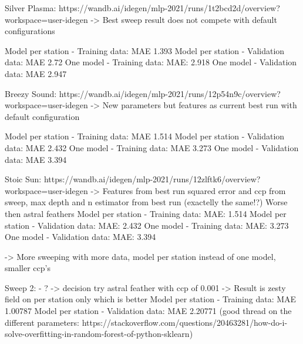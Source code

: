 \documentclass{article}
\begin{document}
{{{{{{{{                                Silver Plasma: https://wandb.ai/idegen/mlp-2021/runs/1t2bcd2d/overview?workspace=user-idegen
                                -> Best sweep result does not compete with default configurations

                                Model per station - Training data: MAE 1.393
                                Model per station - Validation data: MAE 2.72
                                One model - Training data: MAE: 2.918
                                One model - Validation data: MAE 2.947

                                Breezy Sound: https://wandb.ai/idegen/mlp-2021/runs/12p54n9c/overview?workspace=user-idegen
                                -> New parameters but features as current best run with default configuration

                                Model per station - Training data: MAE 1.514
                                Model per station - Validation data: MAE 2.432
                                One model - Training data: MAE 3.273
                                One model - Validation data: MAE 3.394

                                Stoic Sun: https://wandb.ai/idegen/mlp-2021/runs/12zlftk6/overview?workspace=user-idegen
                                -> Features from best run squared error and ccp from sweep, max depth and n estimator from best run (exactelly the same!?)
                                Worse then astral feathers
                                Model per station - Training data: MAE: 1.514
                                Model per station - Validation data: MAE: 2.432
                                One model - Training data: MAE: 3.273
                                One model - Validation data: MAE: 3.394

                                -> More sweeping with more data, model per station instead of one model, smaller ccp's

                                Sweep 2:
                                - ?
                                -> decision try astral feather with ccp of 0.001
                                -> Result is zesty field on per station only which is better
                                Model per station - Training data: MAE 1.00787
                                Model per station - Validation data: MAE 2.20771
                                (good thread on the different parameters: https://stackoverflow.com/questions/20463281/how-do-i-solve-overfitting-in-random-forest-of-python-sklearn)

}}}}}}}}
\end{document}
